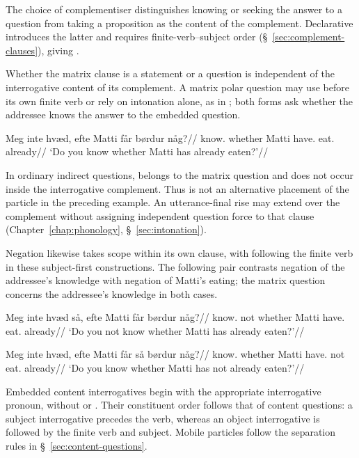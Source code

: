 The choice of complementiser distinguishes knowing or seeking the answer to a question from taking a proposition as the content of the complement. Declarative  introduces the latter and requires finite-verb--subject order (\S~\ref{sec:complement-clauses}), giving .

Whether the matrix clause is a statement or a question is independent of the interrogative content of its complement. A matrix polar question may use  before its own finite verb or rely on intonation alone, as in ; both forms ask whether the addressee knows the answer to the embedded question.

\pex
\begingl
\gla Meg inte hvæd, efte Matti får børdur någ?//
\glb \Second{}\Sg{} \Q{} know.\Pres{} whether Matti have.\Pres{} eat.\PstP{} already//
\glft `Do you know whether Matti has already eaten?'//
\endgl
\xe

In ordinary indirect questions,  belongs to the matrix question and does not occur inside the interrogative complement. Thus  is not an alternative placement of the particle in the preceding example. An utterance-final rise may extend over the complement without assigning independent question force to that clause (Chapter~\ref{chap:phonology}, \S~\ref{sec:intonation}).

Negation likewise takes scope within its own clause, with  following the finite verb in these subject-first constructions. The following pair contrasts negation of the addressee's knowledge with negation of Matti's eating; the matrix question concerns the addressee's knowledge in both cases.

\pex
\begingl
\gla Meg inte hvæd så, efte Matti får børdur någ?//
\glb \Second{}\Sg{} \Q{} know.\Pres{} not whether Matti have.\Pres{} eat.\PstP{} already//
\glft `Do you not know whether Matti has already eaten?'//
\endgl
\xe

\pex
\begingl
\gla Meg inte hvæd, efte Matti får så børdur någ?//
\glb \Second{}\Sg{} \Q{} know.\Pres{} whether Matti have.\Pres{} not eat.\PstP{} already//
\glft `Do you know whether Matti has not already eaten?'//
\endgl
\xe

Embedded content interrogatives begin with the appropriate interrogative pronoun, without  or . Their constituent order follows that of content questions: a subject interrogative precedes the verb, whereas an object interrogative is followed by the finite verb and subject. Mobile particles follow the separation rules in \S~\ref{sec:content-questions}.

